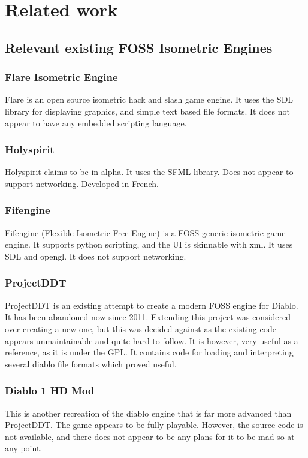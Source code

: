 \chapter{Related work}
    \section{Relevant existing FOSS Isometric Engines}
    	\subsection{Flare Isometric Engine}
    	Flare\cite{flare} is an open source isometric hack and slash game engine. It uses the SDL library for displaying graphics, and simple text based file formats.
    	It does not appear to have any embedded scripting language.
    	
    	\subsection{Holyspirit}
    	Holyspirit\cite{holyspirit} claims to be in alpha. It uses the SFML library. Does not appear to support networking.
    	Developed in French.
    	
    	\subsection{Fifengine}
    	Fifengine\cite{fife} (Flexible Isometric Free Engine) is a FOSS generic isometric game engine.
    	It supports python scripting, and the UI is skinnable with xml.
    	It uses SDL and opengl. It does not support networking.
    	
    	\subsection{ProjectDDT}
    	ProjectDDT\cite{ddt} is an existing attempt to create a modern FOSS engine for Diablo.
    	It has been abandoned now since 2011.
    	Extending this project was considered over creating a new one, but this was decided against as the existing code appears unmaintainable and quite hard to follow.
    	It is however, very useful as a reference, as it is under the GPL.
    	It contains code for loading and interpreting several diablo file formats which proved useful.
    	
    	\subsection{Diablo 1 HD Mod}
    	This\cite{d1hd} is another recreation of the diablo engine that is far more advanced than ProjectDDT. The game appears to be fully playable. However, the source code is not available, and there does not appear to be any plans for it to be mad so at any point.

